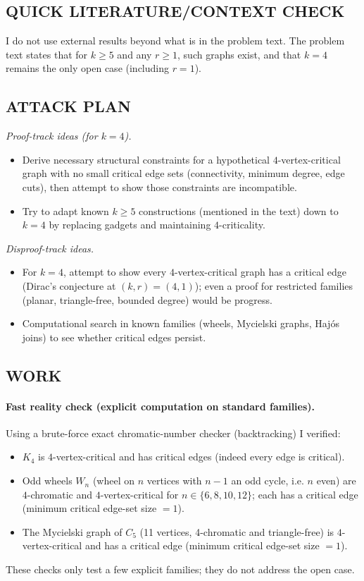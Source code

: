 \subsection*{QUICK LITERATURE/CONTEXT CHECK}
I do not use external results beyond what is in the problem text.
The problem text states that for $k\ge 5$ and any $r\ge 1$, such graphs exist, and that $k=4$ remains the only open case (including $r=1$).

\subsection*{ATTACK PLAN}
\emph{Proof-track ideas (for $k=4$).}
\begin{itemize}
\item Derive necessary structural constraints for a hypothetical $4$-vertex-critical graph with no small critical edge sets (connectivity, minimum degree, edge cuts), then attempt to show those constraints are incompatible.
\item Try to adapt known $k\ge 5$ constructions (mentioned in the text) down to $k=4$ by replacing gadgets and maintaining $4$-criticality.
\end{itemize}
\emph{Disproof-track ideas.}
\begin{itemize}
\item For $k=4$, attempt to show every $4$-vertex-critical graph has a critical edge (Dirac's conjecture at $(k,r)=(4,1)$); even a proof for restricted families (planar, triangle-free, bounded degree) would be progress.
\item Computational search in known families (wheels, Mycielski graphs, Haj\'{o}s joins) to see whether critical edges persist.
\end{itemize}

\subsection*{WORK}
\paragraph{Fast reality check (explicit computation on standard families).}
Using a brute-force exact chromatic-number checker (backtracking) I verified:
\begin{itemize}
\item $K_4$ is $4$-vertex-critical and has critical edges (indeed every edge is critical).
\item Odd wheels $W_n$ (wheel on $n$ vertices with $n-1$ an odd cycle, i.e. $n$ even) are $4$-chromatic and $4$-vertex-critical for $n\in\{6,8,10,12\}$; each has a critical edge (minimum critical edge-set size $=1$).
\item The Mycielski graph of $C_5$ (11 vertices, 4-chromatic and triangle-free) is $4$-vertex-critical and has a critical edge (minimum critical edge-set size $=1$).
\end{itemize}
These checks only test a few explicit families; they do not address the open case.

